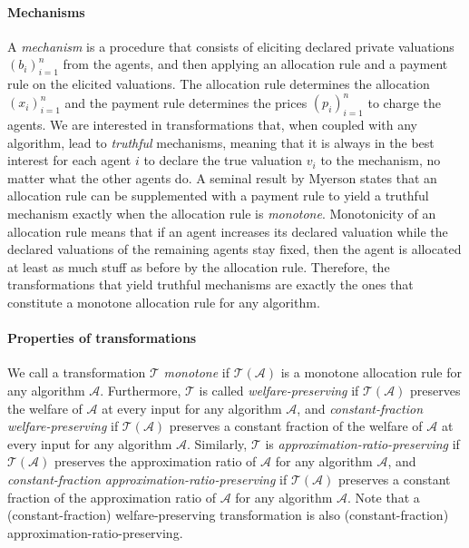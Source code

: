 \documentclass[runningheads,a4paper]{llncs}
\begin{document}
\paragraph{Mechanisms} A \emph{mechanism} is a procedure that consists of eliciting declared private valuations $(b_i)_{i=1}^n$ from the agents, and then applying an allocation rule and a payment rule on the elicited valuations. The allocation rule determines the allocation $(x_i)_{i=1}^n$ and the payment rule determines the prices $(p_i)_{i=1}^n$ to charge the agents. We are interested in transformations that, when coupled with any algorithm, lead to \emph{truthful} mechanisms, meaning that it is always in the best interest for each agent $i$ to declare the true valuation $v_i$ to the mechanism, no matter what the other agents do. A seminal result by Myerson \cite{Myerson81} states that an allocation rule can be supplemented with a payment rule to yield a truthful mechanism exactly when the allocation rule is \emph{monotone}. Monotonicity of an allocation rule means that if an agent increases its declared valuation while the declared valuations of the remaining agents stay fixed, then the agent is allocated at least as much stuff as before by the allocation rule. Therefore, the transformations that yield truthful mechanisms are exactly the ones that constitute a monotone allocation rule for any algorithm. 

\paragraph{Properties of transformations} We call a transformation $\mathcal{T}$ \emph{monotone} if $\mathcal{T}(\mathcal{A})$ is a monotone allocation rule for any algorithm $\mathcal{A}$. Furthermore, $\mathcal{T}$ is called \emph{welfare-preserving} if $\mathcal{T}(\mathcal{A})$ preserves the welfare of $\mathcal{A}$ at every input for any algorithm $\mathcal{A}$, and \emph{constant-fraction welfare-preserving} if $\mathcal{T}(\mathcal{A})$ preserves a constant fraction of the welfare of $\mathcal{A}$ at every input for any algorithm $\mathcal{A}$. Similarly, $\mathcal{T}$ is \emph{approximation-ratio-preserving} if $\mathcal{T}(\mathcal{A})$ preserves the approximation ratio of $\mathcal{A}$ for any algorithm $\mathcal{A}$, and \emph{constant-fraction approximation-ratio-preserving} if $\mathcal{T}(\mathcal{A})$ preserves a constant fraction of the approximation ratio of $\mathcal{A}$ for any algorithm $\mathcal{A}$. Note that a (constant-fraction) welfare-preserving transformation is also (constant-fraction) approximation-ratio-preserving.
\end{document}
